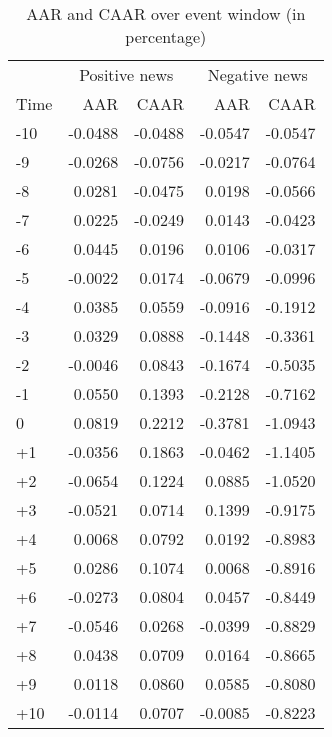 \begin{table}[ht]
\centering
\begin{tabular}{lrrrr}
  \hline
   & \multicolumn{2}{c}{Positive news} & \multicolumn{2}{c}{Negative news}  \\
  Time & AAR & CAAR & AAR & CAAR \\
 \hline
-10 & -0.0488 & -0.0488 & -0.0547 & -0.0547 \\ 
  -9 & -0.0268 & -0.0756 & -0.0217 & -0.0764 \\ 
  -8 & 0.0281 & -0.0475 & 0.0198 & -0.0566 \\ 
  -7 & 0.0225 & -0.0249 & 0.0143 & -0.0423 \\ 
  -6 & 0.0445 & 0.0196 & 0.0106 & -0.0317 \\ 
  -5 & -0.0022 & 0.0174 & -0.0679 & -0.0996 \\ 
  -4 & 0.0385 & 0.0559 & -0.0916 & -0.1912 \\ 
  -3 & 0.0329 & 0.0888 & -0.1448 & -0.3361 \\ 
  -2 & -0.0046 & 0.0843 & -0.1674 & -0.5035 \\ 
  -1 & 0.0550 & 0.1393 & -0.2128 & -0.7162 \\ 
  0 & 0.0819 & 0.2212 & -0.3781 & -1.0943 \\ 
  +1 & -0.0356 & 0.1863 & -0.0462 & -1.1405 \\ 
  +2 & -0.0654 & 0.1224 & 0.0885 & -1.0520 \\ 
  +3 & -0.0521 & 0.0714 & 0.1399 & -0.9175 \\ 
  +4 & 0.0068 & 0.0792 & 0.0192 & -0.8983 \\ 
  +5 & 0.0286 & 0.1074 & 0.0068 & -0.8916 \\ 
  +6 & -0.0273 & 0.0804 & 0.0457 & -0.8449 \\ 
  +7 & -0.0546 & 0.0268 & -0.0399 & -0.8829 \\ 
  +8 & 0.0438 & 0.0709 & 0.0164 & -0.8665 \\ 
  +9 & 0.0118 & 0.0860 & 0.0585 & -0.8080 \\ 
  +10 & -0.0114 & 0.0707 & -0.0085 & -0.8223 \\ 
   \hline
\end{tabular}
\caption{AAR and CAAR over event window (in percentage)} 
\end{table}

